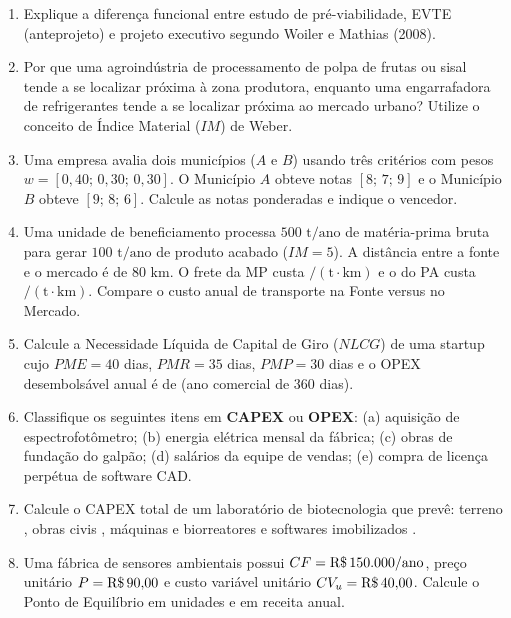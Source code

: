 \begin{enumerate}[leftmargin=1.6em, itemsep=5pt]
  \item Explique a diferença funcional entre estudo de pré-viabilidade, EVTE (anteprojeto) e projeto executivo segundo Woiler e Mathias (2008). \espacoResolucao[1.5cm]
  \item Por que uma agroindústria de processamento de polpa de frutas ou sisal tende a se localizar próxima à zona produtora, enquanto uma engarrafadora de refrigerantes tende a se localizar próxima ao mercado urbano? Utilize o conceito de Índice Material ($IM$) de Weber. \espacoResolucao[1.5cm]
  \item Uma empresa avalia dois municípios ($A$ e $B$) usando três critérios com pesos $w = [0{,}40;\, 0{,}30;\, 0{,}30]$. O Município $A$ obteve notas $[8;\, 7;\, 9]$ e o Município $B$ obteve $[9;\, 8;\, 6]$. Calcule as notas ponderadas e indique o vencedor. \espacoResolucao[1.6cm]
  \item Uma unidade de beneficiamento processa $500\text{ t/ano}$ de matéria-prima bruta para gerar $100\text{ t/ano}$ de produto acabado ($IM = 5$). A distância entre a fonte e o mercado é de $80\text{ km}$. O frete da MP custa $/(\text{t}\cdot\text{km})$ e o do PA custa $/(\text{t}\cdot\text{km})$. Compare o custo anual de transporte na Fonte versus no Mercado. \espacoResolucao[1.8cm]
  \item Calcule a Necessidade Líquida de Capital de Giro ($NLCG$) de uma startup cujo $PME = 40$ dias, $PMR = 35$ dias, $PMP = 30$ dias e o OPEX desembolsável anual é de  (ano comercial de $360$ dias). \espacoResolucao[1.6cm]
  \item Classifique os seguintes itens em \textbf{CAPEX} ou \textbf{OPEX}: (a) aquisição de espectrofotômetro; (b) energia elétrica mensal da fábrica; (c) obras de fundação do galpão; (d) salários da equipe de vendas; (e) compra de licença perpétua de software CAD. \espacoResolucao[1.5cm]
  \item Calcule o CAPEX total de um laboratório de biotecnologia que prevê: terreno , obras civis , máquinas e biorreatores  e softwares imobilizados . \espacoResolucao[1.4cm]
  \item Uma fábrica de sensores ambientais possui $CF = \text{R\$\,}{150.000/\text{ano}}$, preço unitário $P = \text{R\$\,}{90{,}00}$ e custo variável unitário $CV_u = \text{R\$\,}{40{,}00}$. Calcule o Ponto de Equilíbrio em unidades e em receita anual. \espacoResolucao[1.6cm]

\end{enumerate}
